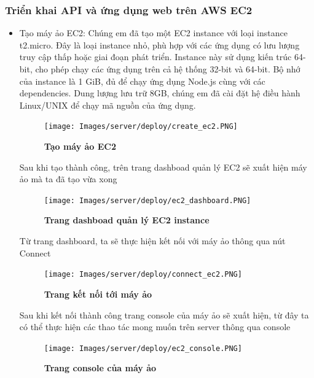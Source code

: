 \subsubsection{Triển khai API và ứng dụng web trên AWS EC2}
\begin{itemize}
  \item Tạo máy ảo EC2: Chúng em đã tạo một EC2 instance với loại instance t2.micro. Đây là loại instance nhỏ, phù hợp với các ứng dụng có lưu lượng truy cập thấp hoặc giai đoạn phát triển. Instance này sử dụng kiến trúc 64-bit, cho phép chạy các ứng dụng trên cả hệ thống 32-bit và 64-bit. Bộ nhớ của instance là 1 GiB, đủ để chạy ứng dụng Node.js cùng với các dependencies. Dung lượng lưu trữ 8GB, chúng em đã cài đặt hệ điều hành Linux/UNIX để chạy mã nguồn của ứng dụng.
  

  \begin{figure}[H]
    \centering
    \texttt{[image: Images/server/deploy/create\_ec2.PNG]}
    \caption[Tạo máy ảo EC2]{\bfseries \fontsize{12pt}{0pt}
    \selectfont Tạo máy ảo EC2}
    \label{create_ec2} %
  \end{figure}

  Sau khi tạo thành công, trên trang dashboad quản lý EC2 sẽ xuất hiện máy ảo mà ta đã tạo vừa xong

  \begin{figure}[H]
    \centering
    \texttt{[image: Images/server/deploy/ec2\_dashboard.PNG]}
    \caption[Trang dashboad quản lý EC2 instance]{\bfseries \fontsize{12pt}{0pt}
    \selectfont Trang dashboad quản lý EC2 instance}
    \label{ec2_dashboard} %
  \end{figure}

  Từ trang dashboard, ta sẽ thực hiện kết nối với máy ảo thông qua nút Connect

  \begin{figure}[H]
  \centering
  \texttt{[image: Images/server/deploy/connect\_ec2.PNG]}
  \caption[Trang kết nối tới máy ảo]{\bfseries \fontsize{12pt}{0pt}
  \selectfont Trang kết nối tới máy ảo}
  \label{connect_ec2} %
\end{figure}


  Sau khi kết nối thành công trang console của máy ảo sẽ xuất hiện, từ đây ta có thể thực hiện các thao tác mong muốn trên server thông qua console

  \begin{figure}[H]
    \centering
    \texttt{[image: Images/server/deploy/ec2\_console.PNG]}
    \caption[Trang console của máy ảo]{\bfseries \fontsize{12pt}{0pt}
    \selectfont Trang console của máy ảo}
    \label{ec2_console} %
  \end{figure}




\end{itemize}
